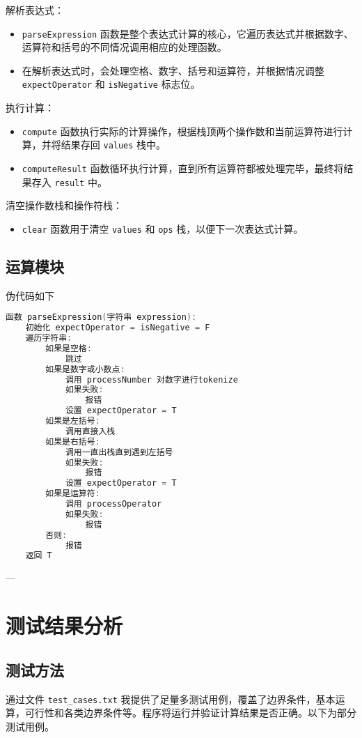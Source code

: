 \documentclass[12pt,a4paper]{article}
\begin{document}
解析表达式：
\begin{itemize}
    \item \texttt{parseExpression} 函数是整个表达式计算的核心，它遍历表达式并根据数字、运算符和括号的不同情况调用相应的处理函数。
    \item 在解析表达式时，会处理空格、数字、括号和运算符，并根据情况调整 \texttt{expectOperator} 和 \texttt{isNegative} 标志位。
\end{itemize}

执行计算：
\begin{itemize}
    \item \texttt{compute} 函数执行实际的计算操作，根据栈顶两个操作数和当前运算符进行计算，并将结果存回 \texttt{values} 栈中。
    \item \texttt{computeResult} 函数循环执行计算，直到所有运算符都被处理完毕，最终将结果存入 \texttt{result} 中。
\end{itemize}

清空操作数栈和操作符栈：
\begin{itemize}
    \item \texttt{clear} 函数用于清空 \texttt{values} 和 \texttt{ops} 栈，以便下一次表达式计算。
\end{itemize}

\subsection{运算模块}
伪代码如下
\begin{lstlisting}[language=C++, basicstyle=\ttfamily\small, frame=single]
    函数 parseExpression(字符串 expression):
    初始化 expectOperator = isNegative = F
    遍历字符串:
        如果是空格:
            跳过
        如果是数字或小数点:
            调用 processNumber 对数字进行tokenize
            如果失败:
                报错
            设置 expectOperator = T
        如果是左括号:
            调用直接入栈
        如果是右括号:
            调用一直出栈直到遇到左括号
            如果失败:
                报错
            设置 expectOperator = T
        如果是运算符:
            调用 processOperator
            如果失败:
                报错
        否则:
            报错 
    返回 T
\end{lstlisting}
---

\section{测试结果分析}
\subsection{测试方法}
通过文件 \texttt{test\_cases.txt} 我提供了足量多测试用例，覆盖了边界条件，基本运算，可行性和各类边界条件等。程序将运行并验证计算结果是否正确。以下为部分测试用例。
\end{document}
